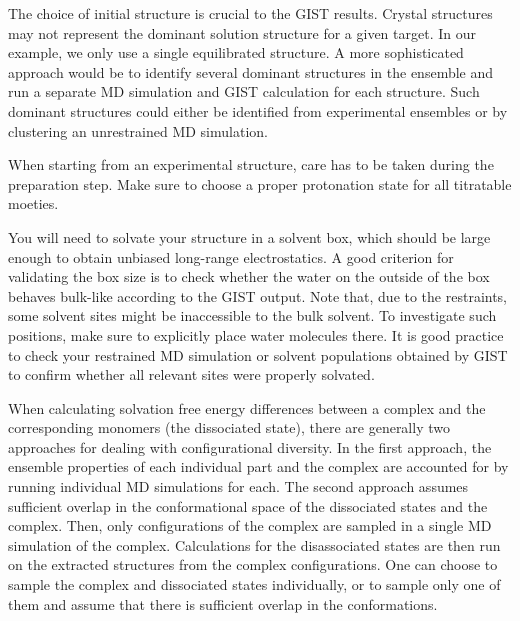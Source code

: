 \documentclass[9pt,tutorial]{livecoms}
\begin{document}
The choice of initial structure is crucial to the GIST results.
Crystal structures may not represent the dominant solution structure for a given target.
In our example, we only use a single equilibrated structure.
A more sophisticated approach would be to identify several dominant structures in the ensemble and run a separate MD simulation and GIST calculation for each structure. Such dominant structures could either be identified from experimental ensembles or by clustering an unrestrained MD simulation. 

When starting from an experimental structure, care has to be taken during the preparation step.
Make sure to choose a proper protonation state for all titratable moeties.

You will need to solvate your structure in a solvent box, which should be large enough to obtain unbiased long-range electrostatics.
A good criterion for validating the box size is to check whether the water on the outside of the box behaves bulk-like according to the GIST output.
Note that, due to the restraints, some solvent sites might be inaccessible to the bulk solvent.
To investigate such positions, make sure to explicitly place water molecules there. %
It is good practice to check your restrained MD simulation or solvent populations obtained by GIST to confirm whether all relevant sites were properly solvated.

When calculating solvation free energy differences between a complex and the corresponding monomers (the dissociated state), there are generally two approaches for dealing with configurational diversity. In the first approach, the ensemble properties of each individual part and the complex are accounted for by running individual MD simulations for each. The second approach assumes sufficient overlap in the conformational space of the dissociated states and the complex. Then, only configurations of the complex are sampled in a single MD simulation of the complex. Calculations for the disassociated states are then run on the extracted structures from the complex configurations.
One can choose to sample the complex and dissociated states individually, or to sample only one of them and assume that there is sufficient overlap in the conformations. 
\end{document}
